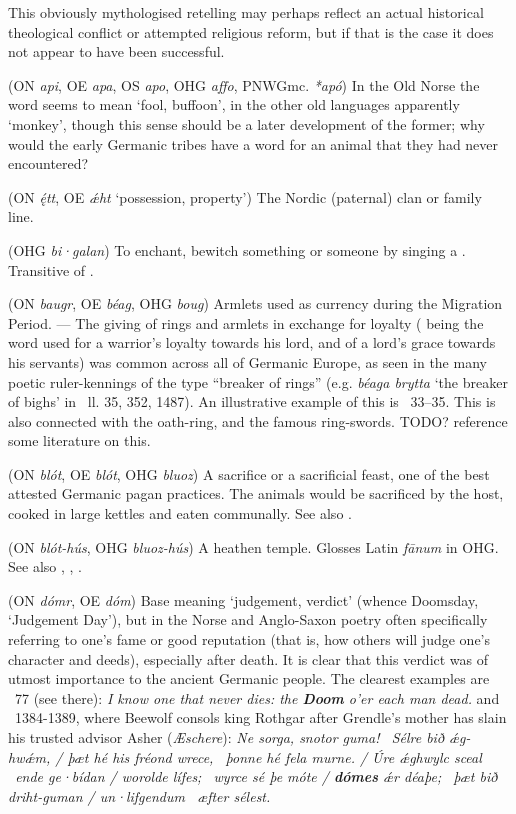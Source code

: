 \begin{itemize}
  This obviously mythologised retelling may perhaps reflect an actual historical theological conflict or attempted religious reform, but if that is the case it does not appear to have been successful.

 (ON \emph{api}, OE \emph{apa}, OS \emph{apo}, OHG \emph{affo}, PNWGmc. \emph{*apó})
  In the Old Norse the word seems to mean ‘fool, buffoon’, in the other old languages apparently ‘monkey’, though this sense should be a later development of the former; why would the early Germanic tribes have a word for an animal that they had never encountered?

 (ON \emph{ę́tt}, OE \emph{ǽht} ‘possession, property’)
  The Nordic (paternal) clan or family line.

 (OHG \emph{bi·galan})
  To enchant, bewitch something or someone by singing a . Transitive of .

 (ON \emph{baugr}, OE \emph{béag}, OHG \emph{boug})
  Armlets used as currency during the Migration Period. — The giving of rings and armlets in exchange for loyalty ( being the word used for a warrior’s loyalty towards his lord, and of a lord’s grace towards his servants) was common across all of Germanic Europe, as seen in the many poetic ruler-kennings of the type “breaker of rings” (e.g. \emph{béaga brytta} ‘the breaker of bighs’ in \Beowulf\ ll. 35, 352, 1487). An illustrative example of this is \Hildebrandslied\ 33–35.
  This is also connected with the oath-ring, and the famous ring-swords. TODO? reference some literature on this.

 (ON \emph{blót}, OE \emph{blót}, OHG \emph{bluoz})
  A sacrifice or a sacrificial feast, one of the best attested Germanic pagan practices. The animals would be sacrificed by the host, cooked in large kettles and eaten communally. See also .

 (ON \emph{blót-hús}, OHG \emph{bluoz-hús})
  A heathen temple. Glosses Latin \emph{fānum} in OHG. See also , , .

 (ON \emph{dómr}, OE \emph{dóm})
  Base meaning ‘judgement, verdict’ (whence Doomsday, ‘Judgement Day’), but in the Norse and Anglo-Saxon poetry often specifically referring to one’s fame or good reputation (that is, how others will judge one’s character and deeds), especially after death. It is clear that this verdict was of utmost importance to the ancient Germanic people. The clearest examples are \Havamal\ 77 (see there): \emph{I know one that never dies: the \textbf{Doom} o’er each man dead.} and \Beowulf\ 1384-1389, where Beewolf consols king Rothgar after Grendle’s mother has slain his trusted advisor Asher (\emph{Æschere}):
  \emph{Ne sorga, snotor guma! \hld\ Sélre bið ǽg-hwǽm, /
  þæt hé his fréond wrece, \hld\ þonne hé fela murne. /
  Úre ǽghwylc sceal \hld\ ende ge·bídan /
  worolde lífes; \hld\ wyrce sé þe móte /
  \textbf{dómes} ǽr déaþe; \hld\ þæt bið driht-guman /
  un·lifgendum \hld\ æfter sélest.}


\end{itemize}
